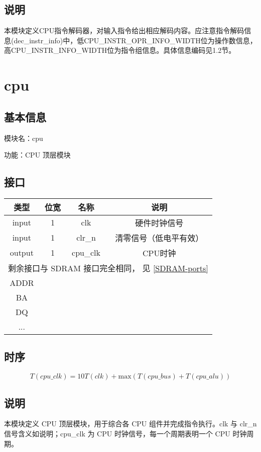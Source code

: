 \subsection{说明}
本模块定义CPU指令解码器，对输入指令给出相应解码内容。应注意指令解码信息(dec\_instr\_info)中，低CPU\_INSTR\_OPR\_INFO\_WIDTH位为操作数信息，高CPU\_INSTR\_INFO\_WIDTH位为指令组信息。具体信息编码见1.2节。

\section{cpu}
\subsection{基本信息}
模块名：cpu

功能：CPU 顶层模块
\subsection{接口}
\begin{tabular}{|c|c|c|c|}
    \hline
    类型    & 位宽 &   名称    &   说明\\\hline
    input   &  1  &   clk     &   硬件时钟信号\\\hline
    input   &  1  &   clr\_n   &   清零信号（低电平有效）\\\hline
    output  &  1  &   cpu\_clk &   CPU时钟\\\hline
    \multicolumn{4}{|c|}{剩余接口与 SDRAM 接口完全相同， 见 \ref{SDRAM-ports}}\\\hline
    ADDR & & & \\ \hline
    BA & & & \\ \hline
    DQ & & & \\ \hline
    ... & & & \\ \hline
\end{tabular}
\subsection{时序}
    $$T(\textit{cpu\_clk})=10T(\textit{clk})+\text{max}(T(\textit{cpu\_bus})+T(\textit{cpu\_alu}))$$
\subsection{说明}
本模块定义 CPU 顶层模块，用于综合各 CPU 组件并完成指令执行。clk 与 clr\_n 信号含义如说明；cpu\_clk 为 CPU 时钟信号，每一个周期表明一个 CPU 时钟周期。